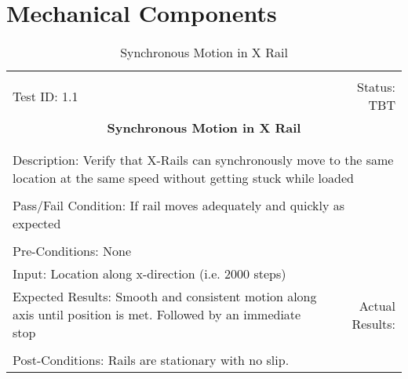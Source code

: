 \documentclass[titlepage]{article}
\begin{document}
\section{Mechanical Components}
\begin{center}%
\begin{table}[h!]
\begin{tabular}{|l r|}\hline&\\[-2mm]
	Test ID: 1.1	&Status: TBT\\[-3mm]
	\multicolumn{2}{|c|}{\textbf{\large{Synchronous Motion in X Rail}}}\\&\\\hline&\\[-3mm]
	\multicolumn{2}{|p{\textwidth}|}{Description: Verify that X-Rails can synchronously move to the same location at the same speed without getting stuck while loaded}\\[1mm]\hline&\\[-3mm]
	\multicolumn{2}{|p{\textwidth}|}{Pass/Fail Condition: If rail moves adequately and quickly as expected}\\[1mm]\hline&\\[-3mm]
	\multicolumn{2}{|p{\textwidth}|}{Pre-Conditions: None}\\[4mm]
	\multicolumn{2}{|p{\textwidth}|}{Input: Location along x-direction (i.e. 2000 steps)}\\[2mm]\hline
	\multicolumn{1}{|p{0.49\textwidth}}{Expected Results: Smooth and consistent motion along axis until position is met. Followed by an immediate stop}	&\multicolumn{1}{|p{0.45\textwidth}|}{Actual Results:}\\\hline&\\[-3mm]
	\multicolumn{2}{|p{\textwidth}|}{Post-Conditions: Rails are stationary with no slip.}\\\hline
\end{tabular}
\caption{Synchronous Motion in X Rail}
\end{table}
\end{center}
\end{document}
